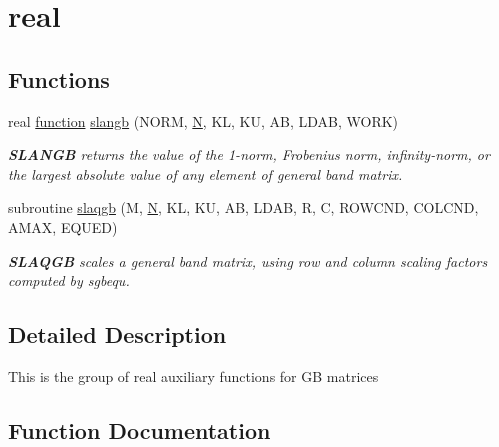 \hypertarget{group__realGBauxiliary}{}\section{real}
\label{group__realGBauxiliary}
\subsection*{Functions}
\begin{DoxyCompactItemize}
\item 
real \hyperlink{afunc_8m_a7b5e596df91eadea6c537c0825e894a7}{function} \hyperlink{group__realGBauxiliary_gaf4b60512534024c921af88def5b806b7}{slangb} (N\+O\+R\+M, \hyperlink{polmisc_8c_a0240ac851181b84ac374872dc5434ee4}{N}, K\+L, K\+U, A\+B, L\+D\+A\+B, W\+O\+R\+K)
\begin{DoxyCompactList}\small\item\em {\bfseries S\+L\+A\+N\+G\+B} returns the value of the 1-\/norm, Frobenius norm, infinity-\/norm, or the largest absolute value of any element of general band matrix. \end{DoxyCompactList}\item 
subroutine \hyperlink{group__realGBauxiliary_ga4041f9392fd5e5137bcbb2ed29ae3b14}{slaqgb} (M, \hyperlink{polmisc_8c_a0240ac851181b84ac374872dc5434ee4}{N}, K\+L, K\+U, A\+B, L\+D\+A\+B, R, C, R\+O\+W\+C\+N\+D, C\+O\+L\+C\+N\+D, A\+M\+A\+X, E\+Q\+U\+E\+D)
\begin{DoxyCompactList}\small\item\em {\bfseries S\+L\+A\+Q\+G\+B} scales a general band matrix, using row and column scaling factors computed by sgbequ. \end{DoxyCompactList}\end{DoxyCompactItemize}


\subsection{Detailed Description}
This is the group of real auxiliary functions for G\+B matrices 

\subsection{Function Documentation}
\hypertarget{group__realGBauxiliary_gaf4b60512534024c921af88def5b806b7}{}
